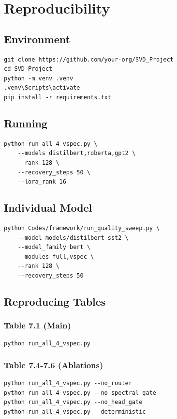 \section{Reproducibility}

\subsection{Environment}

\begin{lstlisting}
git clone https://github.com/your-org/SVD_Project
cd SVD_Project
python -m venv .venv
.venv\Scripts\activate
pip install -r requirements.txt
\end{lstlisting}

\subsection{Running}

\begin{lstlisting}
python run_all_4_vspec.py \
    --models distilbert,roberta,gpt2 \
    --rank 128 \
    --recovery_steps 50 \
    --lora_rank 16
\end{lstlisting}

\subsection{Individual Model}

\begin{lstlisting}
python Codes/framework/run_quality_sweep.py \
    --model models/distilbert_sst2 \
    --model_family bert \
    --modules full,vspec \
    --rank 128 \
    --recovery_steps 50
\end{lstlisting}

\subsection{Reproducing Tables}

\subsubsection{Table 7.1 (Main)}
\begin{lstlisting}
python run_all_4_vspec.py
\end{lstlisting}

\subsubsection{Table 7.4-7.6 (Ablations)}
\begin{lstlisting}
python run_all_4_vspec.py --no_router
python run_all_4_vspec.py --no_spectral_gate
python run_all_4_vspec.py --no_head_gate
python run_all_4_vspec.py --deterministic
\end{lstlisting}


